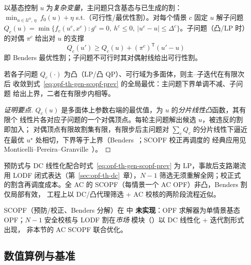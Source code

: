 \begin{definition}[Benders 分解]\label{def:opf-th-gen-benders}
以基态控制 $u$ 为\emph{复杂变量}，主问题只含基态与已生成的割：
$\min_{u\in\mathcal U^0,\,\eta}\ f_0(u)+\eta$ s.t.（可行性/最优性割）。对每个情景
$c$ 固定 $u$ 解子问题 $Q_c(u)=\min\{f_c(u^c,x^c):g^c=0,\ h^c\le0,\
|u^c-u|\le\Delta^c\}$。子问题（凸/LP 时）的对偶 $\pi^c$ 给出对 $u$ 的支撑
\begin{equation}
Q_c(u')\ge Q_c(u)+(\pi^c)^{\mathsf T}(u'-u)
\label{eq:opf-th-gen-benderscut}
\end{equation}
即 Benders 最优性割；子问题不可行时其对偶射线给出可行性割。
\end{definition}

\begin{theorem}\label{thm:opf-th-gen-benders}
若各子问题 $Q_c(\cdot)$ 为凸（LP/凸 QP）、可行域为多面体，则主--子迭代在有限次后
收敛到式~\eqref{eq:opf-th-gen-scopf-prev} 的全局最优：主问题下界单调不减、子问题
给出上界，二者在有限步内相等。
\end{theorem}
\begin{proof}[证明要点]
$Q_c(u)$ 是多面体上参数右端的最优值，为 $u$ 的\emph{分片线性凸}函数，其有限个
线性片各对应子问题的一个对偶顶点。每轮主问题解出候选 $u$，被违反的割即加入；
对偶顶点有限故割集有限，有限步后主问题对 $\sum_c Q_c$ 的分片线性下逼近在最优
$u^\star$ 处相切，下界等于上界（Benders~\cite{opft:benders}；SCOPF 校正再调度的
经典应用见 Monticelli--Pereira--Granville~\cite{opft:monticelli-scopf}）。
\end{proof}

\begin{remark}[与实现的关系]\label{rem:opf-th-gen-scopf}
预防式与 DC 线性化配合时式~\eqref{eq:opf-th-gen-scopf-prev} 为 LP，事故后支路潮流
用 LODF 闭式表达（第~\ref{sec:opf-th-dc}~章），$N\!-\!1$ 筛选无须重解全网；校正式
的割含再调度成本。全 AC 的 SCOPF（每情景一个 AC OPF）非凸，Benders 割仅局部有效，
工程上以 DC/凸代理筛选 + AC 校核的两阶段流程近似。
\end{remark}

\begin{gapnote}
SCOPF（预防/校正、Benders 分解）在  中
\textbf{未实现}：OPF 求解器为单情景基态 OPF；$N\!-\!1$ 安全校核与 LODF 割在\emph{市场}
模块（）以 DC 线性化 + 迭代割形式出现，
非本节的 AC SCOPF 联合优化。
\end{gapnote}

\subsection{数值算例与基准}\label{sec:opf-th-gen-numexp}

